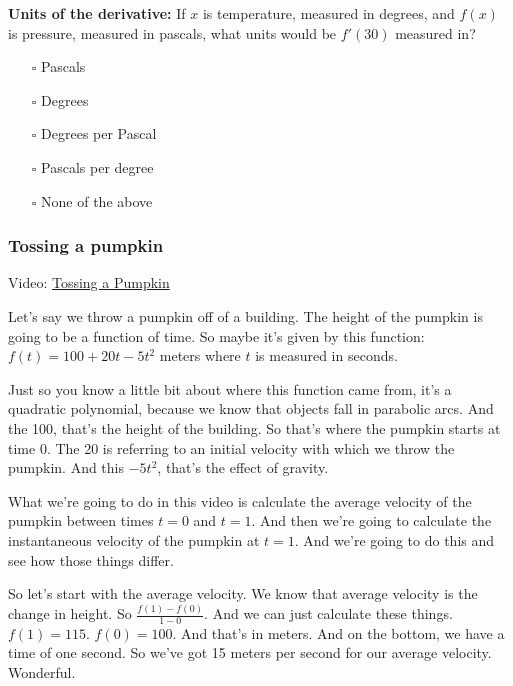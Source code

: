 \documentclass[pdftex, brazil, 12pt, twoside]{article}
\begin{document}
\begin{exercise}
  \textbf{Units of the derivative:} If $x$ is temperature, measured in
  degrees, and $f(x)$ is pressure, measured in pascals, what units would
  be $f'(30)$ measured in? 
\begin{itemize}[noitemsep]
\item[$\square$] Pascals
\item[$\square$] Degrees
\item[$\square$] Degrees per Pascal
\item[$\square$] Pascals per degree
\item[$\square$] None of the above 
\end{itemize}
\end{exercise}

\subsubsection{Tossing a pumpkin}
\label{u1-what-pumpkin}

Video: \href{https://www.youtube.com/watch?v=wGlonwfSO5Q}{Tossing a Pumpkin}

Let's say we throw a pumpkin off of a building.
The height of the pumpkin is going to be a function of time.
So maybe it's given by this function:
$\displaystyle f(t) = 100 + 20t - 5t^2$ meters where
$t$ is measured in seconds.

Just so you know a little bit about where this function came
from, it's a quadratic polynomial,
because we know that objects fall in parabolic arcs.
And the 100, that's the height of the building.
So that's where the pumpkin starts at time 0.
The 20 is referring to an initial velocity with which we
throw the pumpkin.
And this $-5t^2$, that's the effect of gravity.

What we're going to do in this video is calculate
the average velocity of the pumpkin between times
$t = 0$ and $t = 1$.
And then we're going to calculate
the instantaneous velocity of the pumpkin at $t = 1$.
And we're going to do this and see how those things differ.

So let's start with the average velocity.
We know that average velocity is the change in height.
So $\displaystyle \frac{f(1) - f(0)}{1 - 0}$.
And we can just calculate these things. $f(1) = 115$.
$f(0) = 100$. And that's in meters.
And on the bottom, we have a time of one second.
So we've got 15 meters per second
for our average velocity.
Wonderful.
\end{document}
